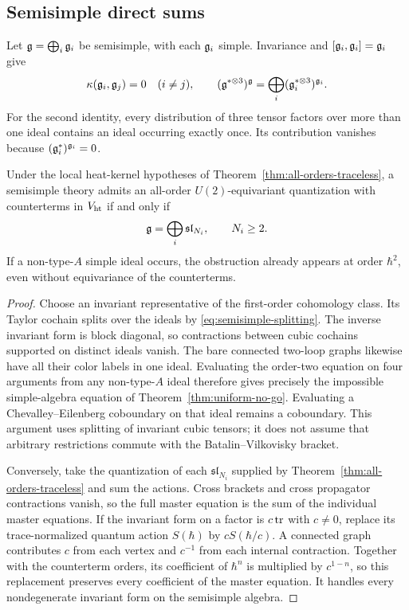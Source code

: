 \subsection{Semisimple direct sums}

Let $\mathfrak g=\bigoplus_i\mathfrak g_i$ be semisimple, with each $\mathfrak g_i$ simple.
Invariance and $[\mathfrak g_i,\mathfrak g_i]=\mathfrak g_i$ give
\begin{equation}
\kappa(\mathfrak g_i,\mathfrak g_j)=0\quad(i\ne j),\qquad
(\mathfrak g^{*\otimes3})^{\mathfrak g}
=\bigoplus_i(\mathfrak g_i^{*\otimes3})^{\mathfrak g_i}.
\label{eq:semisimple-splitting}
\end{equation}
For the second identity, every distribution of three tensor factors
over more than one ideal contains an ideal occurring exactly once.
Its contribution vanishes because $(\mathfrak g_i^*)^{\mathfrak g_i}=0$.

\begin{corollary}
\label{cor:semisimple-classification}
Under the local heat-kernel hypotheses of
Theorem~\ref{thm:all-orders-traceless}, a semisimple theory admits an
all-order $U(2)$-equivariant quantization with counterterms in $V_{\mathrm{ht}}$
if and only if
\begin{equation}
\mathfrak g=\bigoplus_i\mathfrak{sl}_{N_i},\qquad N_i\ge2.
\end{equation}
If a non-type-$A$ simple ideal occurs, the obstruction already appears
at order $\hbar^2$, even without equivariance of the counterterms.
\end{corollary}

\begin{proof}
Choose an invariant representative of the first-order cohomology class.
Its Taylor cochain splits over the ideals by
\eqref{eq:semisimple-splitting}.  The inverse invariant form is block
diagonal, so contractions between cubic cochains supported on distinct
ideals vanish.  The bare connected two-loop graphs likewise have all
their color labels in one ideal.  Evaluating the order-two equation on
four arguments from any non-type-$A$ ideal therefore gives precisely
the impossible simple-algebra equation of
Theorem~\ref{thm:uniform-no-go}.  Evaluating a Chevalley--Eilenberg
coboundary on that ideal remains a coboundary.  This argument uses
splitting of invariant cubic tensors; it does not assume that arbitrary
restrictions commute with the Batalin--Vilkovisky bracket.

Conversely, take the quantization of each $\mathfrak{sl}_{N_i}$ supplied
by Theorem~\ref{thm:all-orders-traceless} and sum the actions.  Cross
brackets and cross propagator contractions vanish, so the full master
equation is the sum of the individual master equations.  If the invariant
form on a factor is $c\operatorname{tr}$ with $c\ne0$, replace its trace-normalized
quantum action $S(\hbar)$ by $cS(\hbar/c)$.  A connected graph contributes
$c$ from each vertex and $c^{-1}$ from each internal contraction.
Together with the counterterm orders, its coefficient of $\hbar^n$
is multiplied by $c^{1-n}$, so this replacement preserves every
coefficient of the master equation.  It handles every nondegenerate
invariant form on the semisimple algebra.
\end{proof}

